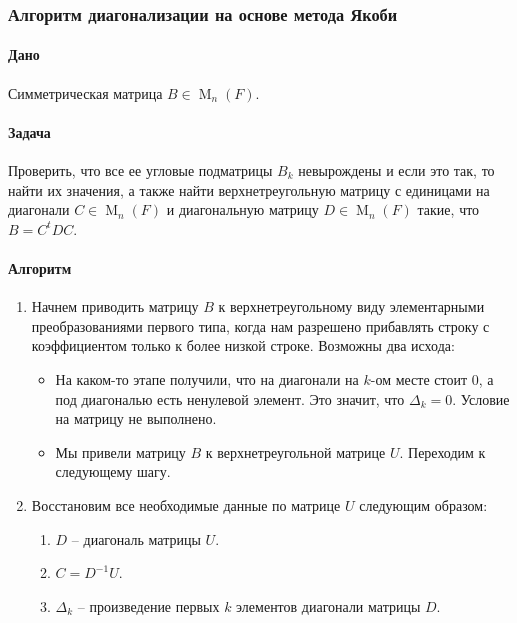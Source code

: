 \subsubsection*{Алгоритм диагонализации на основе метода Якоби}

\paragraph{Дано} Симметрическая матрица $B\in \operatorname{M}_n(F)$.

\paragraph{Задача} Проверить, что все ее угловые подматрицы $B_k$ невырождены и если это так, то найти их значения, а также найти верхнетреугольную матрицу с единицами на диагонали $C\in \operatorname{M}_n(F)$ и диагональную матрицу $D\in\operatorname{M}_n(F)$ такие, что $B = C^t D C$.

\paragraph{Алгоритм}
\begin{enumerate}
\item Начнем приводить матрицу $B$ к верхнетреугольному виду элементарными преобразованиями первого типа, когда нам разрешено прибавлять строку с коэффициентом только к более низкой строке. Возможны два исхода:
\begin{itemize}
\item На каком-то этапе получили, что на диагонали на $k$-ом месте стоит $0$, а под диагональю есть ненулевой элемент. Это значит, что $\Delta_k = 0$. Условие на матрицу не выполнено.

\item Мы привели матрицу $B$ к верхнетреугольной матрице $U$. Переходим к следующему шагу.
\end{itemize}

\item Восстановим все необходимые данные по матрице $U$ следующим образом:
\begin{enumerate}
\item $D$ -- диагональ матрицы $U$.

\item $C =  D^{-1}U$.

\item $\Delta_k$ -- произведение первых $k$ элементов диагонали матрицы $D$.
\end{enumerate}
\end{enumerate}

